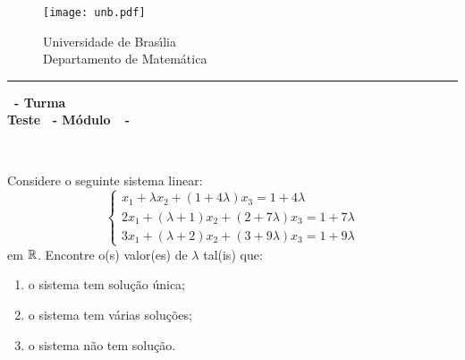 \documentclass[12pt]{exam}
\begin{document}
    \begin{figure}[h]
        \begin{minipage}[c]{1.7cm}
            \texttt{[image: unb.pdf]}
        \end{minipage}
        \hspace{0pt}
        \begin{minipage}[c]{4in}
            {Universidade de Bras{\'\i}lia} \\
            {Departamento de Matem{\'a}tica}
        \end{minipage}
    \end{figure}
    \hrule
    \begin{center}
        {\Large\bf \disciplina\ - Turma \turma}  \\
         {\large\bf Teste \numeroteste\ - Módulo\ \modulo\ -\ \dataavaliacao}
    \end{center}

    \\
    \vspace*{.01cm}

    \vspace{.4cm}

    \questao{} Considere o seguinte sistema linear:
    \[
        \begin{cases}
            x_1 + \lambda x_2 + (1 + 4\lambda )x_3 = 1 + 4\lambda \\
            2x_1 + (\lambda  + 1)x_2 + (2 + 7\lambda )x_3 = 1 + 7\lambda \\
            3x_1 + (\lambda  + 2)x_2 + (3 + 9\lambda )x_3 = 1 + 9\lambda
        \end{cases}
    \]
em $\mathbb{R}$. Encontre o(s) valor(es) de $\lambda$ tal(is) que:
\begin{enumerate}[label={\alph*})]
    \item o sistema tem solução única;

    \item o sistema tem várias soluções;

    \item o sistema não tem solução.
\end{enumerate}
\end{document}

